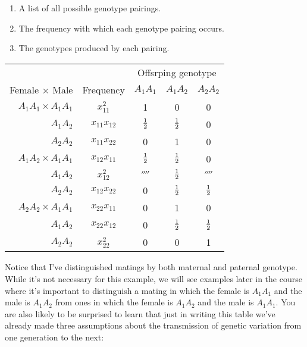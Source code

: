 \begin{enumerate}

\item A list of all possible genotype pairings.

\item The frequency with which each genotype pairing occurs.

\item The genotypes produced by each pairing.

\end{enumerate}

\begin{center}
\begin{tabular}{rcccc}
\hline\hline
                       &           & \multicolumn{3}{c}{Offsrping genotype} \\
Female $\times$ Male   & Frequency     & $A_1A_1$ & $A_1A_2$ & $A_2A_2$ \\
\hline
$A_1A_1 \times A_1A_1$ & $x_{11}^2$     &        1 &        0 &        0 \\
              $A_1A_2$ & $x_{11}x_{12}$ &    $\frac{1}{2}$ &    $\frac{1}{2}$ &        0 \\
              $A_2A_2$ & $x_{11}x_{22}$ &        0 &        1 &        0 \\
$A_1A_2 \times A_1A_1$ & $x_{12}x_{11}$ &    $\frac{1}{2}$ &    $\frac{1}{2}$ &        0 \\
              $A_1A_2$ & $x_{12}^2$     &  $\fourth$ &    $\frac{1}{2}$ &  $\fourth$ \\
              $A_2A_2$ & $x_{12}x_{22}$ &        0 &    $\frac{1}{2}$ &    $\frac{1}{2}$ \\
$A_2A_2 \times A_1A_1$ & $x_{22}x_{11}$ &        0 &        1 &        0 \\
              $A_1A_2$ & $x_{22}x_{12}$ &        0 &    $\frac{1}{2}$ &    $\frac{1}{2}$ \\
              $A_2A_2$ & $x_{22}^2$     &        0 &         0 &
                       1 \\
\hline
\end{tabular}
\end{center}
Notice that I've distinguished matings by both maternal and paternal
genotype. While it's not necessary for this example, we will see
examples later in the course where it's important to distinguish a
mating in which the female is $A_1A_1$ and the male is $A_1A_2$ from
ones in which the female is $A_1A_2$ and the male is $A_1A_1$. You are
also likely to be surprised to learn that just in writing this table
we've already made three assumptions about the transmission of genetic
variation from one generation to the next:

